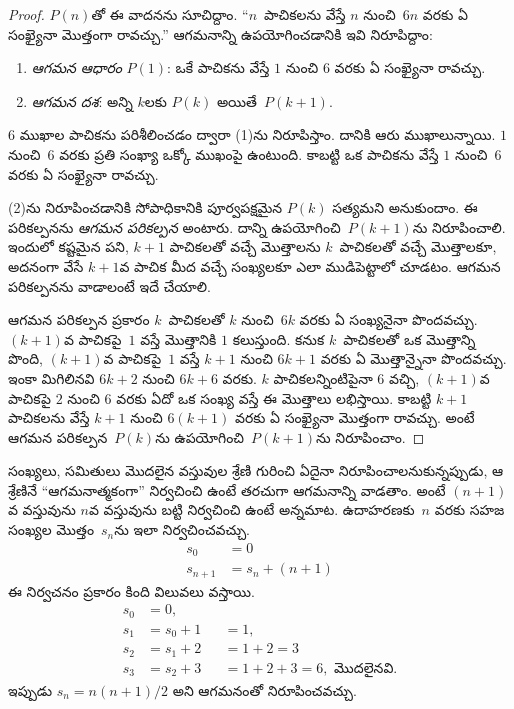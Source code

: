 \documentclass[../../../include/open-logic-section]{subfiles}
\begin{document}
\begin{proof}
$P(n)$తో ఈ వాదనను సూచిద్దాం. ``$n$~పాచికలను వేస్తే $n$ నుంచి~$6n$ వరకు ఏ సంఖ్యైనా మొత్తంగా రావచ్చు.'' ఆగమనాన్ని ఉపయోగించడానికి ఇవి నిరూపిద్దాం:
\begin{enumerate}
\item \emph{ఆగమన ఆధారం} $P(1)$: ఒకే పాచికను వేస్తే $1$ నుంచి $6$ వరకు ఏ సంఖ్యైనా రావచ్చు.
\item \emph{ఆగమన దశ}: అన్ని $k$లకు $P(k)$ అయితే~$P(k+1)$.
\end{enumerate}

$6$ ముఖాల పాచికను పరిశీలించడం ద్వారా (1)ను నిరూపిస్తాం. దానికి ఆరు ముఖాలున్నాయి. $1$ నుంచి~$6$ వరకు ప్రతి సంఖ్యా ఒక్కో ముఖంపై ఉంటుంది. కాబట్టి ఒక పాచికను వేస్తే $1$ నుంచి~$6$ వరకు ఏ సంఖ్యైనా రావచ్చు.

(2)ను నిరూపించడానికి సోపాధికానికి పూర్వపక్షమైన $P(k)$ సత్యమని అనుకుందాం. ఈ పరికల్పనను \emph{ఆగమన పరికల్పన} అంటారు. దాన్ని ఉపయోగించి~$P(k+1)$ను నిరూపించాలి. ఇందులో కష్టమైన పని, $k+1$ పాచికలతో వచ్చే మొత్తాలను
$k$~పాచికలతో వచ్చే మొత్తాలకూ, అదనంగా వేసే $k+1$వ పాచిక
మీద వచ్చే సంఖ్యలకూ ఎలా ముడిపెట్టాలో చూడటం.
ఆగమన పరికల్పనను వాడాలంటే ఇదే చేయాలి.

ఆగమన పరికల్పన ప్రకారం $k$~పాచికలతో $k$ నుంచి~$6k$ వరకు ఏ సంఖ్యనైనా పొందవచ్చు. $(k+1)$వ పాచికపై~$1$ వస్తే మొత్తానికి $1$ కలుస్తుంది. కనుక $k$~పాచికలతో ఒక మొత్తాన్ని పొంది, $(k+1)$వ పాచికపై~$1$ వస్తే $k+1$ నుంచి $6k+1$ వరకు ఏ మొత్తాన్నైనా పొందవచ్చు. ఇంకా మిగిలినవి $6k+2$ నుంచి $6k+6$ వరకు. $k$ పాచికలన్నింటిపైనా $6$ వచ్చి, $(k+1)$వ పాచికపై $2$ నుంచి $6$ వరకు ఏదో ఒక సంఖ్య వస్తే ఈ మొత్తాలు లభిస్తాయి. కాబట్టి $k+1$ పాచికలను వేస్తే $k+1$ నుంచి $6(k+1)$ వరకు ఏ సంఖ్యైనా మొత్తంగా రావచ్చు. అంటే ఆగమన పరికల్పన~$P(k)$ను ఉపయోగించి~$P(k+1)$ను నిరూపించాం.
\end{proof}

సంఖ్యలు, సమితులు మొదలైన వస్తువుల శ్రేణి గురించి ఏదైనా
నిరూపించాలనుకున్నప్పుడు, ఆ శ్రేణినే ``ఆగమనాత్మకంగా''
నిర్వచించి ఉంటే తరచుగా ఆగమనాన్ని వాడతాం. అంటే
$(n+1)$వ వస్తువును $n$వ వస్తువును బట్టి నిర్వచించి ఉంటే
అన్నమాట. ఉదాహరణకు~$n$ వరకు సహజ సంఖ్యల మొత్తం~$s_n$ను
ఇలా నిర్వచించవచ్చు.
\begin{align*}
  s_0 & = 0\\
  s_{n+1} & = s_n + (n+1)
\end{align*}
ఈ నిర్వచనం ప్రకారం కింది విలువలు వస్తాయి.
\begin{align*}
  s_0 & = 0,\\
  s_1 & = s_0 + 1 && = 1,\\
  s_2 & = s_1 + 2 && = 1 + 2 = 3\\
  s_3 & = s_2 + 3 && = 1 + 2 + 3 = 6, \text{ మొదలైనవి.}
\end{align*}
ఇప్పుడు $s_n = n(n+1)/2$ అని ఆగమనంతో నిరూపించవచ్చు.
\end{document}
